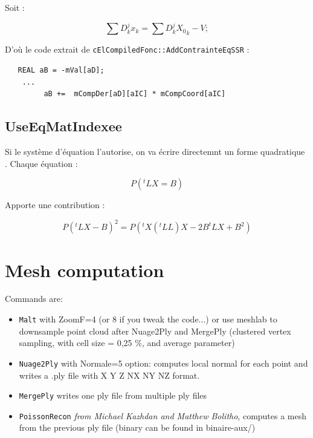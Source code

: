 Soit  :

\begin{equation}
    \sum{D^j_k x_k} =   \sum{D^j_k {X_0}_k} -V;
\end{equation}

D'o\`u le code extrait de {\tt cElCompiledFonc::AddContrainteEqSSR} :

\begin{verbatim}
   REAL aB = -mVal[aD];
    ...
         aB +=  mCompDer[aD][aIC] * mCompCoord[aIC]
\end{verbatim}


\subsection{UseEqMatIndexee}


Si le syst\`eme d'\'equation l'autorise, on va \'ecrire directemnt un forme
quadratique . Chaque \'equation :

\begin{equation}
    P (^t L  X =  B)
\end{equation}

Apporte une contribution :

\begin{equation}
    P (^t L  X -  B) ^2  = P (^t X (^tLL)X  -2B^tL X + B^2)
\end{equation}

\section{Mesh computation}

Commands are:

\begin{itemize}
\item {\tt Malt} with ZoomF=4 (or 8 if you tweak the code...) or use meshlab to downsample point cloud after Nuage2Ply and MergePly (clustered vertex sampling, with cell size = 0,25 \%, and average parameter)
\item {\tt Nuage2Ply} with Normale=5 option: computes local normal for each point and writes a .ply file with X Y Z NX NY NZ format.
\item {\tt MergePly} writes one ply file from multiple ply files
\item {\tt PoissonRecon} {\it from Michael Kazhdan and Matthew Bolitho}, computes a mesh from the previous ply file (binary can be found in binaire-aux/)

\end{itemize}

